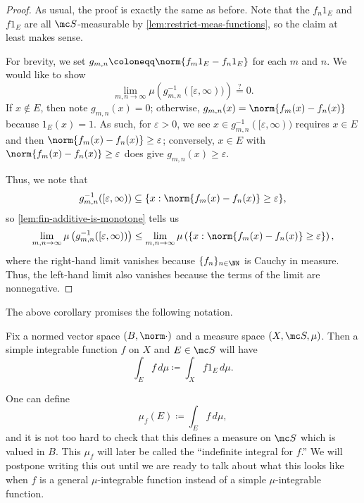 \documentclass[../notes.tex]{subfiles}
\begin{document}
\begin{proof}
	As usual, the proof is exactly the same as before. Note that the $f_n1_E$ and $f1_E$ are all $\mc S$-measurable by \autoref{lem:restrict-meas-functions}, so the claim at least makes sense.

	For brevity, we set $g_{m,n}\coloneqq\norm{f_m1_E-f_n1_E}$ for each $m$ and $n$. We would like to show
	\[\lim_{m,n\to\infty}\mu\left(g_{m,n}^{-1}([\varepsilon,\infty))\right)\stackrel?=0.\]
	If $x\notin E$, then note $g_{m,n}(x)=0$; otherwise, $g_{m,n}(x)=\norm{f_m(x)-f_n(x)}$ because $1_E(x)=1$. As such, for $\varepsilon>0$, we see $x\in g_{m,n}^{-1}([\varepsilon,\infty))$ requires $x\in E$ and then $\norm{f_m(x)-f_n(x)}\ge\varepsilon$; conversely, $x\in E$ with $\norm{f_m(x)-f_n(x)}\ge\varepsilon$ does give $g_{m,n}(x)\ge\varepsilon$.

	Thus, we note that
	\[g_{m,n}^{-1}([\varepsilon,\infty))\subseteq\{x:\norm{f_m(x)-f_n(x)}\ge\varepsilon\},\]
	so \autoref{lem:fin-additive-is-monotone} tells us
	\[\lim_{m,n\to\infty}\mu\left(g_{m,n}^{-1}([\varepsilon,\infty))\right)\le\lim_{m,n\to\infty}\mu\left(\{x:\norm{f_m(x)-f_n(x)}\ge\varepsilon\}\right),\]
	where the right-hand limit vanishes because $\{f_{n}\}_{n\in\NN}$ is Cauchy in measure. Thus, the left-hand limit also vanishes because the terms of the limit are nonnegative.
\end{proof}
The above corollary promises the following notation.
\begin{notation}
	Fix a normed vector space $(B,\norm\cdot)$ and a measure space $(X,\mc S,\mu)$. Then a simple integrable function $f$ on $X$ and $E\in\mc S$ will have
	\[\int_Ef\,d\mu\coloneqq\int_Xf1_E\,d\mu.\]
\end{notation}
\begin{remark}
	One can define
	\[\mu_f(E)\coloneqq\int_Ef\,d\mu,\]
	and it is not too hard to check that this defines a measure on $\mc S$ which is valued in $B$. This $\mu_f$ will later be called the ``indefinite integral for $f$.'' We will postpone writing this out until we are ready to talk about what this looks like when $f$ is a general $\mu$-integrable function instead of a simple $\mu$-integrable function.
\end{remark}
\end{document}
